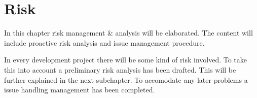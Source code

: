 \chapter{Risk}
In this chapter risk management & analysis will be elaborated. The content will include proactive risk analysis and issue management procedure. 

In every development project there will be some kind of risk involved. To take this into account a preliminary risk analysis has been drafted. This will be further explained in the next subchapter. To accomodate any later problems a issue handling management has been completed. 


%
%